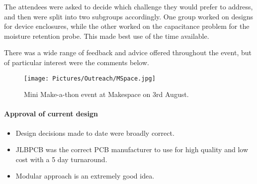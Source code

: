 The attendees were asked to decide which challenge they would prefer to address, and then were split into two subgroups accordingly. One group worked on designs for device enclosures, while the other worked on the capacitance problem for the moisture retention probe. This made best use of the time available.

There was a wide range of feedback and advice offered throughout the event, but of particular interest were the comments below.

        \begin{figure}[ht!]
    	\centering
    	\texttt{[image: Pictures/Outreach/MSpace.jpg]}
    	\captionsetup{justification = centering}
    	\caption{Mini Make-a-thon event at Makespace on 3rd August.}
    	\label{fig:MSpace}
     \end{figure}
\paragraph{Approval of current design}   
   \begin{itemize}[label={$\checkmark$}]
\item Design decisions made to date were broadly correct.
   \item JLBPCB was the correct PCB manufacturer to use for high quality and low cost with a 5 day turnaround. 
 \item Modular approach is an extremely good idea. 

   \end{itemize}
   
